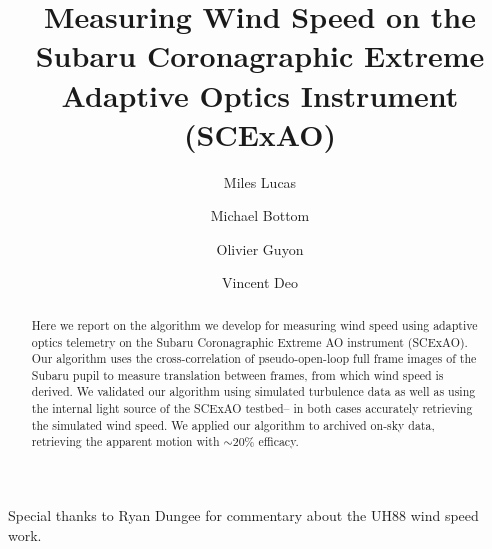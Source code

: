 \documentclass[modern]{aastex63}
\begin{document}
\title{Measuring Wind Speed on the Subaru Coronagraphic Extreme Adaptive Optics Instrument (SCExAO)}

\author[0000-0001-6341-310X]{Miles Lucas}

\author{Michael Bottom}

\author{Olivier Guyon}

\author{Vincent Deo}

\begin{abstract}
Here we report on the algorithm we develop for measuring wind speed using adaptive optics telemetry on the Subaru Coronagraphic Extreme AO instrument (SCExAO). Our algorithm uses the cross-correlation of pseudo-open-loop full frame images of the Subaru pupil to measure translation between frames, from which wind speed is derived. We validated our algorithm using simulated turbulence data as well as using the internal light source of the SCExAO testbed-- in both cases accurately retrieving the simulated wind speed. We applied our algorithm to archived on-sky data, retrieving the apparent motion with $\sim$20\% efficacy.
\end{abstract}

\keywords{}






\begin{acknowledgements}
Special thanks to Ryan Dungee for commentary about the UH88 wind speed work.
\end{acknowledgements}



{}


\appendix
\end{document}

